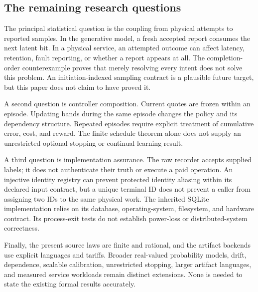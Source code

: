\subsection{The remaining research questions}
The principal statistical question is the coupling from physical attempts to reported samples. In the generative model, a fresh accepted report consumes the next latent bit. In a physical service, an attempted outcome can affect latency, retention, fault reporting, or whether a report appears at all. The completion-order counterexample proves that merely resolving every intent does not solve this problem. An initiation-indexed sampling contract is a plausible future target, but this paper does not claim to have proved it.


A second question is controller composition. Current quotes are frozen within an episode. Updating bands during the same episode changes the policy and its dependency structure. Repeated episodes require explicit treatment of cumulative error, cost, and reward. The finite schedule theorem alone does not supply an unrestricted optional-stopping or continual-learning result.

A third question is implementation assurance. The raw recorder accepts supplied labels; it does not authenticate their truth or execute a paid operation. An injective identity registry can prevent protected identity aliasing within its declared input contract, but a unique terminal ID does not prevent a caller from assigning two IDs to the same physical work. The inherited SQLite implementation relies on its database, operating-system, filesystem, and hardware contract. Its process-exit tests do not establish power-loss or distributed-system correctness.

Finally, the present source laws are finite and rational, and the artifact backends use explicit languages and tariffs. Broader real-valued probability models, drift, dependence, scalable calibration, unrestricted stopping, larger artifact languages, and measured service workloads remain distinct extensions. None is needed to state the existing formal results accurately.

